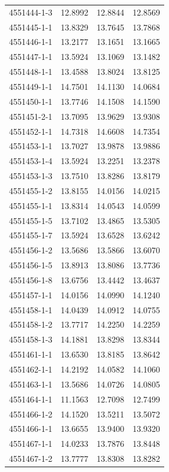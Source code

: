 \begin{longtable}{lrrr}
4551444-1-3 & 12.8992 & 12.8844 & 12.8569 \\
4551445-1-1 & 13.8329 & 13.7645 & 13.7868 \\
4551446-1-1 & 13.2177 & 13.1651 & 13.1665 \\
4551447-1-1 & 13.5924 & 13.1069 & 13.1482 \\
4551448-1-1 & 13.4588 & 13.8024 & 13.8125 \\
4551449-1-1 & 14.7501 & 14.1130 & 14.0684 \\
4551450-1-1 & 13.7746 & 14.1508 & 14.1590 \\
4551451-2-1 & 13.7095 & 13.9629 & 13.9308 \\
4551452-1-1 & 14.7318 & 14.6608 & 14.7354 \\
4551453-1-1 & 13.7027 & 13.9878 & 13.9886 \\
4551453-1-4 & 13.5924 & 13.2251 & 13.2378 \\
4551453-1-3 & 13.7510 & 13.8286 & 13.8179 \\
4551455-1-2 & 13.8155 & 14.0156 & 14.0215 \\
4551455-1-1 & 13.8314 & 14.0543 & 14.0599 \\
4551455-1-5 & 13.7102 & 13.4865 & 13.5305 \\
4551455-1-7 & 13.5924 & 13.6528 & 13.6242 \\
4551456-1-2 & 13.5686 & 13.5866 & 13.6070 \\
4551456-1-5 & 13.8913 & 13.8086 & 13.7736 \\
4551456-1-8 & 13.6756 & 13.4442 & 13.4637 \\
4551457-1-1 & 14.0156 & 14.0990 & 14.1240 \\
4551458-1-1 & 14.0439 & 14.0912 & 14.0755 \\
4551458-1-2 & 13.7717 & 14.2250 & 14.2259 \\
4551458-1-3 & 14.1881 & 13.8298 & 13.8344 \\
4551461-1-1 & 13.6530 & 13.8185 & 13.8642 \\
4551462-1-1 & 14.2192 & 14.0582 & 14.1060 \\
4551463-1-1 & 13.5686 & 14.0726 & 14.0805 \\
4551464-1-1 & 11.1563 & 12.7098 & 12.7499 \\
4551466-1-2 & 14.1520 & 13.5211 & 13.5072 \\
4551466-1-1 & 13.6655 & 13.9400 & 13.9320 \\
4551467-1-1 & 14.0233 & 13.7876 & 13.8448 \\
4551467-1-2 & 13.7777 & 13.8308 & 13.8282 \\

\end{longtable}
